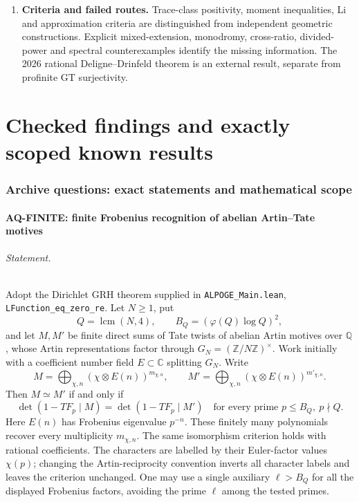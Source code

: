 \documentclass[11pt,a4paper]{article}
\theoremstyle{definition}\newtheorem{definition}[theorem]{Definition}
\theoremstyle{remark}\newtheorem{remark}[theorem]{Remark}
\begin{document}
\begin{enumerate}
finite recognition bound for semisimple abelian Artin--Tate objects;
BR-AT-01 and CC-F01/F01b give the exact shifted analytic factors.
The effective Siegel deduction, abelian-field Chebotarev and prime-search
bounds discharge their original conditional hypotheses.
\item \textbf{Criteria and failed routes.} Trace-class positivity,
moment inequalities, Li and approximation criteria are distinguished
from independent geometric constructions. Explicit mixed-extension,
monodromy, cross-ratio, divided-power and spectral counterexamples
identify the missing information. The 2026 rational Deligne--Drinfeld
theorem is an external result, separate from profinite GT surjectivity.
\end{enumerate}
\tableofcontents
\clearpage
\part{Checked findings and exactly scoped known results}

\section{Archive questions: exact statements and mathematical scope}

\subsection{AQ-FINITE: finite Frobenius recognition of abelian Artin--Tate motives}
\paragraph{Statement.}
Adopt the Dirichlet GRH theorem supplied in \nolinkurl{ALPOGE_Main.lean},
\nolinkurl{LFunction_eq_zero_re}. Let $N\geq1$, put
\[
 Q=\operatorname{lcm}(N,4),\qquad B_Q=(\varphi(Q)\log Q)^2,
\]
and let $M,M'$ be finite direct sums of Tate twists of abelian Artin
motives over $\mathbb Q$, whose Artin representations factor through
$G_N=(\mathbb Z/N\mathbb Z)^\times$. Work initially with a coefficient
number field $E\subset\mathbb C$ splitting $G_N$. Write
\[
 M=\bigoplus_{\chi,n}(\chi\otimes E(n))^{m_{\chi,n}},
 \qquad
 M'=\bigoplus_{\chi,n}(\chi\otimes E(n))^{m'_{\chi,n}}.
\]
Then $M\simeq M'$ if and only if
\[
 \det(1-TF_p\mid M)=\det(1-TF_p\mid M')
 \quad\text{for every prime }p\leq B_Q,\ p\nmid Q.                 \tag{AQ.1}
\]
Here $E(n)$ has Frobenius eigenvalue $p^{-n}$. These finitely many
polynomials recover every multiplicity $m_{\chi,n}$. The same
isomorphism criterion holds with rational coefficients.
The characters are labelled by their Euler-factor values
$\chi(p)$; changing the Artin-reciprocity convention inverts
all character labels and leaves the criterion unchanged.
One may use a single auxiliary $\ell>B_Q$ for all the
displayed Frobenius factors, avoiding the prime $\ell$
among the tested primes.
\end{document}
